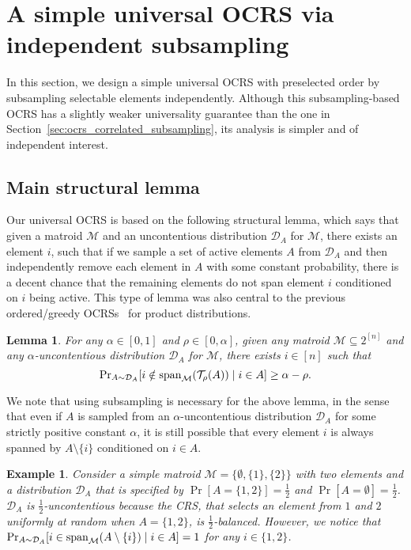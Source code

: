 \documentclass[11pt]{article}
\newcommand{\D}{\mathcal D}
\newcommand{\M}{{\mathcal M}}
\newcommand{\T}{{\mathcal T}}
\newcommand{\spa}{\textnormal{span}}
\newtheorem{lemma}[theorem]{Lemma}
\newtheorem{example}[theorem]{Example}
\begin{document}
\section{A simple universal OCRS via independent subsampling}\label{sec:ocrs_independent_subsampling}
In this section, we design a simple universal OCRS with preselected order by subsampling selectable elements independently. Although this subsampling-based OCRS has a slightly weaker universality guarantee than the one in Section~\ref{sec:ocrs_correlated_subsampling}, its analysis is simpler and of independent interest.

\subsection{Main structural lemma}
Our universal OCRS is based on the following structural lemma, which says that given a matroid $\M$ and an uncontentious distribution $\D_A$ for $\M$, there exists an element $i$, such that if we sample a set of active elements $A$ from $\D_A$ and then independently remove each element in $A$ with some constant probability, there is a decent chance that the remaining elements do not span element $i$ conditioned on $i$ being active. This type of lemma was also central to the previous ordered/greedy OCRSs~\citep{chekuri2014submodular,feldman2021online} for product distributions.

\begin{lemma}\label{lem:uncontentious_subsampled_elements}
For any $\alpha\in [0,1]$ and $\rho\in [0,\alpha]$, given any matroid $\M\subseteq 2^{[n]}$ and any $\alpha$-uncontentious distribution $\D_A$ for $\M$, there exists $i\in [n]$ such that
\[
    {\Pr}_{A\sim \D_A}[i\notin \spa_{\M}(\T_{\rho}(A))\mid i\in A]\ge\alpha-\rho.
\]
\end{lemma}
We note that using subsampling is necessary for the above lemma, in the sense that even if $A$ is sampled from an $\alpha$-uncontentious distribution $\D_A$ for some strictly positive constant $\alpha$, it is still possible that every element $i$ is always spanned by $A\setminus\{i\}$ conditioned on $i\in A$.
\begin{example}
Consider a simple matroid $\M=\{\emptyset,\{1\},\{2\}\}$ with two elements and a distribution $\D_A$ that is specified by $\Pr[A=\{1,2\}]=\frac{1}{2}$ and $\Pr[A=\emptyset]=\frac{1}{2}$. $\D_A$ is $\frac{1}{2}$-uncontentious because the CRS, that selects an element from $1$ and $2$ uniformly at random when $A=\{1,2\}$, is $\frac{1}{2}$-balanced. However, we notice that ${\Pr}_{A\sim \D_A}[i\in \spa_{\M}(A\setminus\{i\})\mid i\in A] = 1$ for any $i\in\{1,2\}$.
\end{example}
\end{document}
